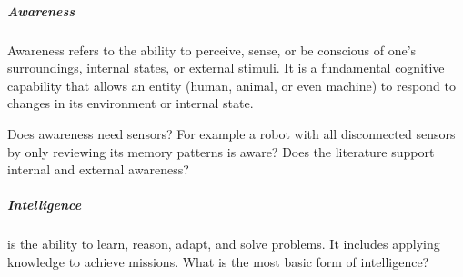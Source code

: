\documentclass{book}
\begin{document}
\subparagraph{Awareness}
Awareness refers to the ability to perceive, sense, or be conscious of one’s surroundings, internal states, or external stimuli. It is a fundamental cognitive capability that allows an entity (human, animal, or even machine) to respond to changes in its environment or internal state.

Does awareness need sensors? For example a robot with all disconnected sensors by only reviewing its memory patterns is aware? Does the literature support internal and external awareness?




\subparagraph{Intelligence}  is the ability to learn, reason, adapt, and solve problems. It includes applying knowledge to achieve missions. What is the most basic form of intelligence?
\end{document}
